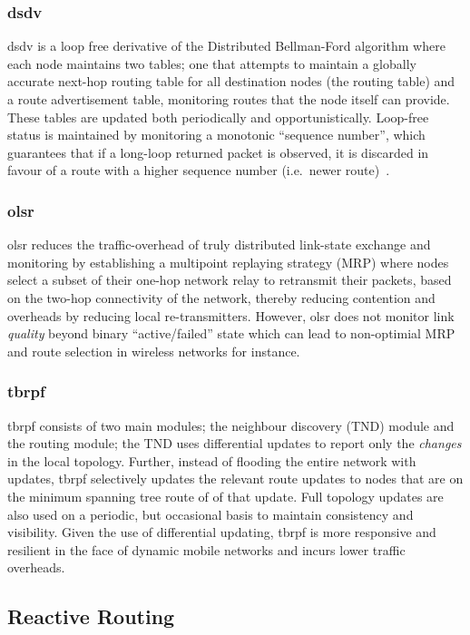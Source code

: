 \subsubsection{\gls{dsdv}}
\acrlong{dsdv} is a loop free derivative of the Distributed Bellman-Ford algorithm where each node maintains two tables; one that attempts to maintain a globally accurate next-hop routing table for all destination nodes (the routing table) and a route advertisement table, monitoring routes that the node itself can provide. These tables are updated both periodically and opportunistically. Loop-free status is maintained by monitoring a monotonic ``sequence number'', which guarantees that if a long-loop returned packet is observed, it is discarded in favour of a route with a higher sequence number (i.e.\ newer route)~\cite{Perkins1994}.\
\subsubsection{\gls{olsr}}
\acrlong{olsr} reduces the traffic-overhead of truly distributed link-state exchange and monitoring by establishing a multipoint replaying strategy (MRP) where nodes select a subset of their one-hop network relay to retransmit their packets, based on the two-hop connectivity of the network, thereby reducing contention and overheads by reducing local re-transmitters. However, \gls{olsr} does not monitor link \emph{quality} beyond binary ``active/failed'' state which can lead to non-optimial MRP and route selection in wireless networks for instance.\\
\subsubsection{\gls{tbrpf}}
\acrlong{tbrpf} consists of two main modules; the neighbour discovery (TND) module and the routing module; the TND uses differential updates to report only the \emph{changes} in the local topology. Further, instead of flooding the entire network with updates, \gls{tbrpf} selectively updates the relevant route updates to nodes that are on the minimum spanning tree route of of that update. Full topology updates are also used on a periodic, but occasional basis to maintain consistency and visibility. Given the use of differential updating, \gls{tbrpf} is more responsive and resilient in the face of dynamic mobile networks and incurs lower traffic overheads.\cite{Bellur1999}\\

\subsection{Reactive Routing}

